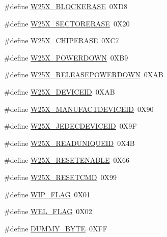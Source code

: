 \begin{DoxyCompactItemize}
\item 
\#define \mbox{\hyperlink{group___w25_x___exported___defines_ga45492dfdb1827757a822c927a174d8f4}{W25\+X\+\_\+\+B\+L\+O\+C\+K\+E\+R\+A\+SE}}~0\+X\+D8
\item 
\#define \mbox{\hyperlink{group___w25_x___exported___defines_ga156b489b4a73d10109c628f476ae2cba}{W25\+X\+\_\+\+S\+E\+C\+T\+O\+R\+E\+R\+A\+SE}}~0\+X20
\item 
\#define \mbox{\hyperlink{group___w25_x___exported___defines_ga3d3b6b5fd9a144adc4ec9bcb386a627a}{W25\+X\+\_\+\+C\+H\+I\+P\+E\+R\+A\+SE}}~0\+X\+C7
\item 
\#define \mbox{\hyperlink{group___w25_x___exported___defines_ga6f86a39788602b78340644f18290cd10}{W25\+X\+\_\+\+P\+O\+W\+E\+R\+D\+O\+WN}}~0\+X\+B9
\item 
\#define \mbox{\hyperlink{group___w25_x___exported___defines_ga0f09d17a66f22044a9dfe6a246cf167e}{W25\+X\+\_\+\+R\+E\+L\+E\+A\+S\+E\+P\+O\+W\+E\+R\+D\+O\+WN}}~0\+X\+AB
\item 
\#define \mbox{\hyperlink{group___w25_x___exported___defines_ga7c22604b247e086479546f037c05f858}{W25\+X\+\_\+\+D\+E\+V\+I\+C\+E\+ID}}~0\+X\+AB
\item 
\#define \mbox{\hyperlink{group___w25_x___exported___defines_ga3e51926247deb7872af9a6cec379ff54}{W25\+X\+\_\+\+M\+A\+N\+U\+F\+A\+C\+T\+D\+E\+V\+I\+C\+E\+ID}}~0\+X90
\item 
\#define \mbox{\hyperlink{group___w25_x___exported___defines_ga9c170ec2cc6fa5c861da3904d172decc}{W25\+X\+\_\+\+J\+E\+D\+E\+C\+D\+E\+V\+I\+C\+E\+ID}}~0\+X9F
\item 
\#define \mbox{\hyperlink{group___w25_x___exported___defines_gadb9039720fb57d30cdc8d354a8af7447}{W25\+X\+\_\+\+R\+E\+A\+D\+U\+N\+I\+Q\+U\+E\+ID}}~0\+X4B
\item 
\#define \mbox{\hyperlink{group___w25_x___exported___defines_gaa9df975381b4e2212f1c8533004692a5}{W25\+X\+\_\+\+R\+E\+S\+E\+T\+E\+N\+A\+B\+LE}}~0\+X66
\item 
\#define \mbox{\hyperlink{group___w25_x___exported___defines_ga81564d5cbdfcc61df0f8ac9519630ffd}{W25\+X\+\_\+\+R\+E\+S\+E\+T\+C\+MD}}~0\+X99
\item 
\#define \mbox{\hyperlink{group___w25_x___exported___defines_ga48091a4d280b9da4d009473c6c7138fb}{W\+I\+P\+\_\+\+F\+L\+AG}}~0\+X01
\item 
\#define \mbox{\hyperlink{group___w25_x___exported___defines_ga4cfcccbaabe71c0fe356845dbc77a93b}{W\+E\+L\+\_\+\+F\+L\+AG}}~0\+X02
\item 
\#define \mbox{\hyperlink{group___w25_x___exported___defines_gadc81a065700d3af56b6fb631585e3641}{D\+U\+M\+M\+Y\+\_\+\+B\+Y\+TE}}~0\+X\+FF

\end{DoxyCompactItemize}
